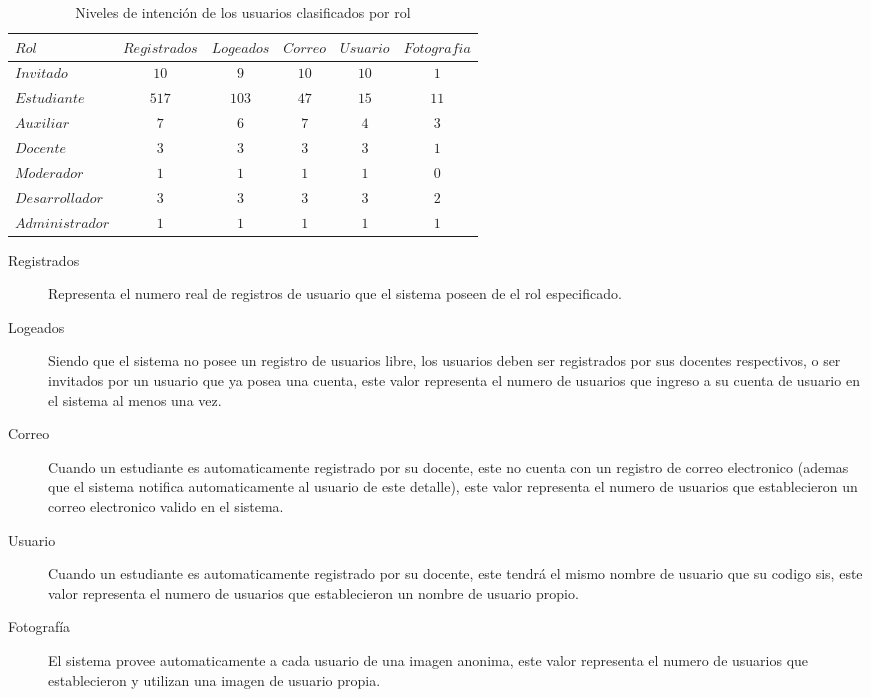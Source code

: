 \begin{table}
\centering
\begin{tabular}{l|c c c c c}
$Rol$ & $Registrados$ & $Logeados$ & $Correo$ & $Usuario$ & $Fotografia$ \\
\hline
$Invitado$      & $ 10$ & $  9$ & $10$ & $10$ & $ 1$ \\
$Estudiante$    & $517$ & $103$ & $47$ & $15$ & $11$ \\
$Auxiliar$      & $  7$ & $  6$ & $ 7$ & $ 4$ & $ 3$ \\
$Docente$       & $  3$ & $  3$ & $ 3$ & $ 3$ & $ 1$ \\
$Moderador$     & $  1$ & $  1$ & $ 1$ & $ 1$ & $ 0$ \\
$Desarrollador$ & $  3$ & $  3$ & $ 3$ & $ 3$ & $ 2$ \\
$Administrador$ & $  1$ & $  1$ & $ 1$ & $ 1$ & $ 1$ \\
\end{tabular}
\caption{Niveles de intención de los usuarios clasificados por rol}
\label{usuarios_tabla_1}
\end{table}

\begin{description}
\item [Registrados] Representa el numero real de registros de usuario que el
sistema poseen de el rol especificado.
\item [Logeados] Siendo que el sistema no posee un registro de usuarios libre,
los usuarios deben ser registrados por sus docentes respectivos, o ser invitados
por un usuario que ya posea una cuenta, este valor representa el numero de
usuarios que ingreso a su cuenta de usuario en el sistema al menos una vez.
\item [Correo] Cuando un estudiante es automaticamente registrado por su
docente, este no cuenta con un registro de correo electronico (ademas que el
sistema notifica automaticamente al usuario de este detalle), este valor
representa el numero de usuarios que establecieron un correo electronico valido
en el sistema.
\item [Usuario] Cuando un estudiante es automaticamente registrado por su
docente, este tendrá el mismo nombre de usuario que su codigo sis, este valor
representa el numero de usuarios que establecieron un nombre de usuario propio.
\item [Fotografía] El sistema provee automaticamente a cada usuario de una
imagen anonima, este valor representa el numero de usuarios que establecieron
y utilizan una imagen de usuario propia.
\end{description}


